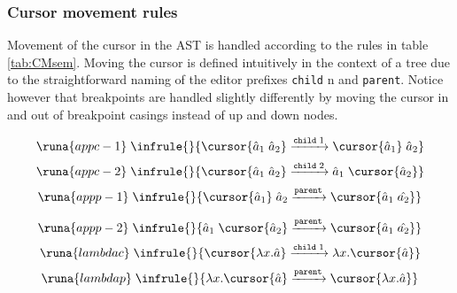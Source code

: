 \subsubsection*{Cursor movement rules}
Movement of the cursor in the AST is handled according to the rules in table \ref{tab:CMsem}. Moving the cursor is defined intuitively in the context of a tree due to the straightforward naming of the editor prefixes \texttt{child} n and \texttt{parent}. Notice however that breakpoints are handled slightly differently by moving the cursor in and out of breakpoint casings instead of up and down nodes.
\vspace*{-0.8cm}

\begin{table}[H]
    \centering
    \begin{adjmulticols}{3}{-56pt}{-1in}
    \begin{equation*}
            \runa{appc-1}\; \infrule{}{\cursor{\hat{a}_1\; \hat{a}_2} \xrightarrow{\texttt{child}\; 1}  \cursor{\hat{a}_1}\; \hat{a}_2}
    \end{equation*}\break
    \begin{equation*}
            \runa{appc-2}\; \infrule{}{\cursor{\hat{a}_1\; \hat{a}_2} \xrightarrow{\texttt{child}\; 2} \hat{a}_1\; \cursor{\hat{a}_2}}
    \end{equation*}\break
    \begin{equation*}
            \runa{appp-1}\; \infrule{}{\cursor{\hat{a}_1}\; \hat{a}_2 \xrightarrow{\texttt{parent}} \cursor{\hat{a}_1\; \hat{a_2}}}
    \end{equation*}
    \end{adjmulticols}
    \vspace*{-1.5cm}
    \begin{adjmulticols}{3}{-56pt}{-1in}
    \begin{equation*}
            \runa{appp-2}\; \infrule{}{\hat{a}_1\; \cursor{\hat{a}_2} \xrightarrow{\texttt{parent}} \cursor{\hat{a}_1\; \hat{a_2}}}
    \end{equation*}\break
    \begin{equation*}
            \runa{lambdac}\; \infrule{}{\cursor{\lambda x.\hat{a}} \xrightarrow{\texttt{child}\; 1} \lambda x.\cursor{\hat{a}}}
    \end{equation*}\break
    \begin{equation*}
            \runa{lambdap}\; \infrule{}{\lambda x.\cursor{\hat{a}} \xrightarrow{\texttt{parent}} \cursor{\lambda x.\hat{a}}}
    \end{equation*}

\end{adjmulticols}
\end{table}
